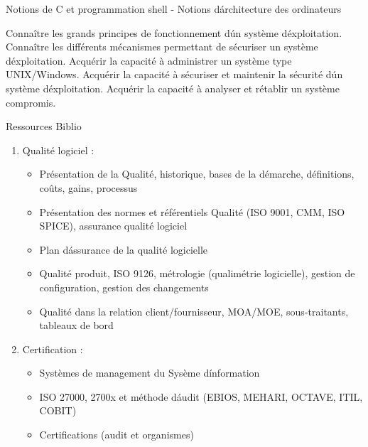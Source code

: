 { Notions de C et programmation shell
- Notions d\'architecture des ordinateurs} 
{\begin{itemize}
\ObjItem Connaître les grands principes de fonctionnement d\'un système d\'exploitation.
\ObjItem Connaître les différents mécanismes permettant de sécuriser un système d\'exploitation.
\ObjItem Acquérir la capacité à administrer un système type UNIX/Windows.
\ObjItem Acquérir la capacité à sécuriser et maintenir la sécurité d\'un système d\'exploitation.
\ObjItem Acquérir la capacité à analyser et rétablir un système compromis.
\end{itemize} 
} 
{Ressources} 
{Biblio} 
 
\vfill

{
\begin{enumerate}
\item Qualité logiciel :
  \begin{itemize}
  \item Présentation de la Qualité, historique, bases de la démarche, définitions, coûts, gains, processus
  \item Présentation des normes et référentiels Qualité (ISO 9001, CMM, ISO SPICE), assurance qualité logiciel
  \item Plan d\'assurance de la qualité logicielle
  \item Qualité produit, ISO 9126, métrologie (qualimétrie logicielle), gestion de configuration, gestion des changements
  \item Qualité dans la relation client/fournisseur, MOA/MOE, sous-traitants, tableaux de bord
  \end{itemize} 
\item Certification :
  \begin{itemize}
  \item Systèmes de management du Sysème d\'information
  \item ISO 27000, 2700x et méthode d\'audit (EBIOS, MEHARI, OCTAVE, ITIL, COBIT)
  \item Certifications (audit et organismes)
  \end{itemize} 
\end{enumerate}
} 
